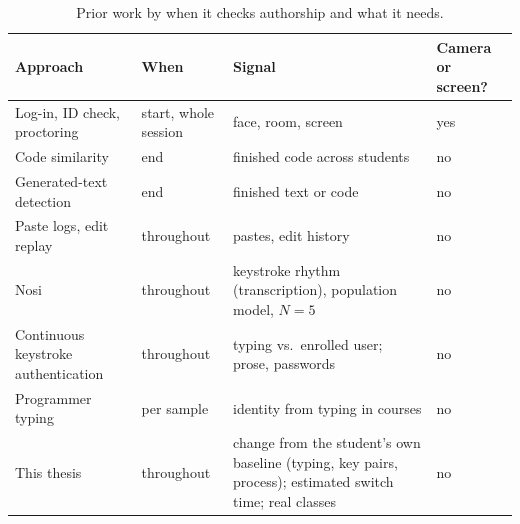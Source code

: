 \begin{table}[ht]
  \centering
  \caption{Prior work by when it checks authorship and what it needs.}
  \label{tab:rw-gap}
  \small
  \begin{tabularx}{\linewidth}{@{}>{\raggedright\arraybackslash}p{3.3cm}
      >{\raggedright\arraybackslash}p{1.9cm}
      >{\raggedright\arraybackslash}X
      >{\raggedright\arraybackslash}p{2.4cm}@{}}
    \toprule
    Approach & When & Signal & Camera or screen? \\
    \midrule
    Log-in, ID check, proctoring \cite{atoum2017proctoring,nigam2021proctoring}
      & start, whole session & face, room, screen & yes \\
    Code similarity \cite{schleimer2003winnowing,prechelt2002jplag,novak2019similarity}
      & end & finished code across students & no \\
    Generated-text detection \cite{weberwulff2023testing,hoq2024chatgpt}
      & end & finished text or code & no \\
    Paste logs, edit replay
      & throughout & pastes, edit history & no \\
    Nosi \cite{lueder2026nosi}
      & throughout & keystroke rhythm (transcription), population model, $N=5$ & no \\
    Continuous keystroke authentication \cite{bours2012continuous,acien2022typenet}
      & throughout & typing vs.\ enrolled user; prose, passwords & no \\
    Programmer typing \cite{longi2015identification,leinonen2016exams}
      & per sample & identity from typing in courses & no \\
    \midrule
    This thesis
      & throughout & change from the student's own baseline (typing, key pairs, process); estimated switch time; real classes & no \\
    \bottomrule
  \end{tabularx}
\end{table}
